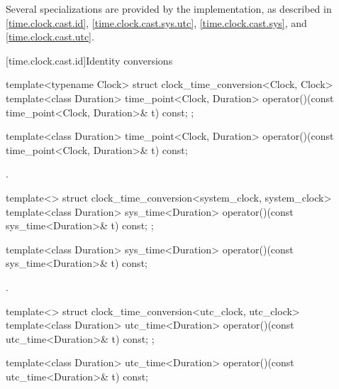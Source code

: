 \pnum
Several specializations are provided by the implementation,
as described in
\ref{time.clock.cast.id},
\ref{time.clock.cast.sys.utc},
\ref{time.clock.cast.sys}, and
\ref{time.clock.cast.utc}.

[time.clock.cast.id]{Identity conversions}

\begin{codeblock}
template<typename Clock>
struct clock_time_conversion<Clock, Clock> {
  template<class Duration>
    time_point<Clock, Duration>
      operator()(const time_point<Clock, Duration>& t) const;
};
\end{codeblock}

%
\begin{itemdecl}
template<class Duration>
  time_point<Clock, Duration>
    operator()(const time_point<Clock, Duration>& t) const;
\end{itemdecl}

\begin{itemdescr}
\pnum
\returns {}.
\end{itemdescr}

\begin{codeblock}
template<>
struct clock_time_conversion<system_clock, system_clock> {
  template<class Duration>
    sys_time<Duration>
      operator()(const sys_time<Duration>& t) const;
};
\end{codeblock}

%
\begin{itemdecl}
template<class Duration>
  sys_time<Duration>
    operator()(const sys_time<Duration>& t) const;
\end{itemdecl}

\begin{itemdescr}
\pnum
\returns {}.
\end{itemdescr}

\begin{codeblock}
template<>
struct clock_time_conversion<utc_clock, utc_clock> {
  template<class Duration>
    utc_time<Duration>
      operator()(const utc_time<Duration>& t) const;
};
\end{codeblock}

%
\begin{itemdecl}
template<class Duration>
  utc_time<Duration>
    operator()(const utc_time<Duration>& t) const;
\end{itemdecl}

